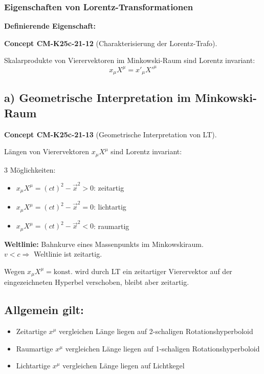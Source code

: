 \documentclass[10pt, letterpaper]{article}
\newcommand{\CustomHeading}[3]{%
  \par\medskip\noindent%
  \textbf{#1 #2} \textnormal{(#3)}.\enskip%
}
\newenvironment{CONC}[2]{\begin{unitbox}\CustomHeading{Concept}{#1}{#2}}{\end{unitbox}}
\begin{document}
\pagebreak


\subsubsection*{Eigenschaften von Lorentz-Transformationen}

\textbf{Definierende Eigenschaft:} 

\begin{CONC}{CM-K25c-21-12}{Charakterisierung der Lorentz-Trafo}
Skalarprodukte von Vierervektoren im Minkowski-Raum sind Lorentz invariant: 
$$x_\mu X^\mu = x'_\mu X'^\mu$$
\end{CONC}

\subsection*{a) Geometrische Interpretation im Minkowski-Raum}

\begin{CONC}{CM-K25c-21-13}{Geometrische Interpretation von LT}
Längen von Vierervektoren $x_\mu X^\mu$ sind Lorentz invariant:

3 Möglichkeiten:
\begin{itemize}
\item $x_\mu X^\mu = (ct)^2 - \vec{x}^2 > 0$: zeitartig
\item $x_\mu X^\mu = (ct)^2 - \vec{x}^2 = 0$: lichtartig
\item $x_\mu X^\mu = (ct)^2 - \vec{x}^2 < 0$: raumartig
\end{itemize}

\textbf{Weltlinie:} Bahnkurve eines Massenpunkts im Minkowskiraum.\\
$v < c \Rightarrow$ Weltlinie ist zeitartig.


Wegen $x_\mu X^\mu = \text{konst.}$ wird durch LT ein zeitartiger Vierervektor auf der eingezeichneten Hyperbel verschoben, bleibt aber zeitartig.
\subsection*{Allgemein gilt:}
\begin{itemize}
\item Zeitartige $x^\mu$ vergleichen Länge liegen auf 2-schaligen Rotationshyperboloid
\item Raumartige $x^\mu$ vergleichen Länge liegen auf 1-schaligen Rotationshyperboloid
\item Lichtartige $x^\mu$ vergleichen Länge liegen auf Lichtkegel
\end{itemize}
\end{CONC}
\end{document}
